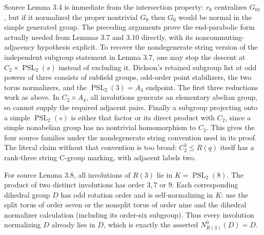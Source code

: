 \documentclass[11pt,a4paper]{article}
\begin{document}
Source Lemma 3.4 is immediate from the intersection property:
$r_0$ centralizes $G_{01}$, but if it normalized the proper nontrivial
$G_0$ then $G_0$ would be normal in the simple generated group.
The preceding arguments prove the end-parabolic form actually needed
from Lemmas 3.7 and 3.10 directly, with its noncommuting-adjacency
hypothesis explicit. To recover the nondegenerate string version of
the independent subgroup statement in Lemma 3.7, one may stop the
descent at $C_2\times\operatorname{PSL}_2(s)$ instead of excluding
it. Dickson's retained subgroup list at odd powers of three consists
of subfield groups, odd-order point stabilizers, the two torus
normalizers, and the $\operatorname{PSL}_2(3)=A_4$ endpoint.
The first three reductions work as above. In $C_2\times A_4$, all
involutions generate an elementary abelian group, so cannot supply
the required adjacent pairs. Finally a subgroup projecting onto a
simple $\operatorname{PSL}_2(s)$ is either that factor or its direct
product with $C_2$, since a simple nonabelian group has no nontrivial
homomorphism to $C_2$. This gives the four source families under the
nondegenerate string convention used in its proof. The literal claim
without that convention is too broad: $C_2^3\le R(q)$ itself has a
rank-three string C-group marking, with adjacent labels two.

For source Lemma 3.8, all involutions of $R(3)$ lie in
$K=\operatorname{PSL}_2(8)$. The product of two distinct involutions
has order $3,7$ or $9$. Each corresponding dihedral group $D$ has
odd rotation order and is self-normalizing in $K$: use the split
torus of order seven or the nonsplit torus of order nine and the
dihedral normalizer calculation (including its order-six subgroup).
Thus every involution normalizing $D$ already lies in $D$, which
is exactly the asserted $N^0_{R(3)}(D)=D$.
\end{document}

